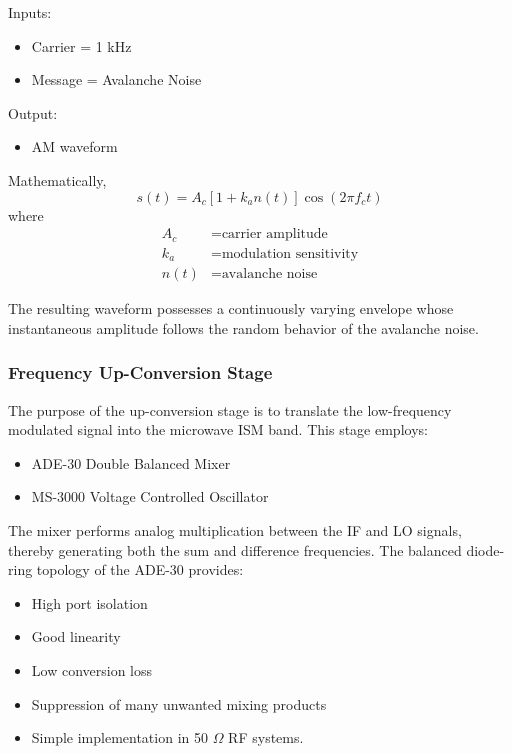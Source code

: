\documentclass[12pt,a4paper]{report}
\begin{document}
	\noindent Inputs:
	\begin{itemize}
		\item Carrier = 1 kHz
		\item Message = Avalanche Noise
	\end{itemize}
	
	\noindent Output:
	\begin{itemize}
		\item AM waveform
	\end{itemize}
	
	Mathematically,
	\begin{equation}
		s(t) = A_c \left[1 + k_a n(t)\right] \cos(2\pi f_c t)
	\end{equation}
	where
	\begin{align*}
		A_c &= \text{carrier amplitude} \\
		k_a &= \text{modulation sensitivity} \\
		n(t) &= \text{avalanche noise}
	\end{align*}
	
	The resulting waveform possesses a continuously varying envelope whose instantaneous amplitude follows the random behavior of the avalanche noise.
	
	\subsubsection{Frequency Up-Conversion Stage}
	
	The purpose of the up-conversion stage is to translate the low-frequency modulated signal into the microwave ISM band. This stage employs:
	\begin{itemize}
		\item ADE-30 Double Balanced Mixer
		\item MS-3000 Voltage Controlled Oscillator
	\end{itemize}
	
	The mixer performs analog multiplication between the IF and LO signals, thereby generating both the sum and difference frequencies. The balanced diode-ring topology of the ADE-30 provides:
	\begin{itemize}
		\item High port isolation
		\item Good linearity
		\item Low conversion loss
		\item Suppression of many unwanted mixing products
		\item Simple implementation in 50 $\Omega$ RF systems.
	\end{itemize}
	
\end{document}
